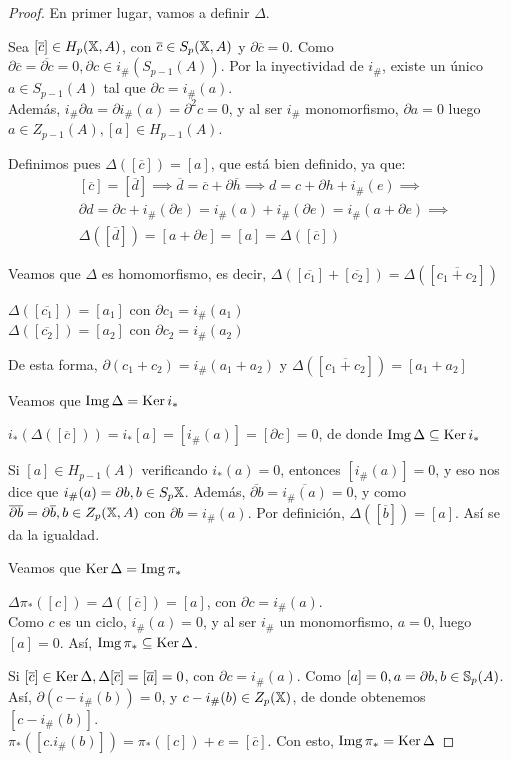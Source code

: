 \begin{proof}
  En primer lugar, vamos a definir $\Delta$.

  Sea $[\overline{c}] \in H_p(\X, A)$, con $\overline{c} \in S_p(\X, A)$ y $\partial \overline{c} = 0$. Como $\partial \overline{c} = \overline{\partial c} = 0,
  \partial c \in i_\#(S_{p-1}(A))$. Por la inyectividad de $i_\#$, existe un único $a \in S_{p-1}(A)$ tal que $\partial c = i_\#(a)$. \\
  Además, $i_\# \partial a = \partial i_\#(a) = \partial^2 c = 0$, y al ser $i_\#$ monomorfismo, $\partial a = 0$ luego $a \in Z_{p-1}(A), [a] \in H_{p-1}(A)$.

  Definimos pues $\Delta([\overline{c}]) = [a]$, que está bien definido, ya que:
  \begin{align*}
    &[\overline{c}] = [\overline{d}] \implies \overline{d} = \overline{c} + \partial \overline{h} \implies d = c + \partial h + i_\#(e) \implies \\
    &\partial d = \partial c + i_\#(\partial e) = i_\#(a) + i_\#(\partial e) = i_\#(a + \partial e) \implies \\
    &\Delta([\overline{d}]) = [a + \partial e] = [a] = \Delta([\overline{c}])
  \end{align*}

  Veamos que $\Delta$ es homomorfismo, es decir, $\Delta([\overline{c_1}] + [\overline{c_2}]) = \Delta([\overline{c_1 + c_2}])$

  $\Delta([\overline{c_1}]) = [a_1]$ con $\partial c_1 = i_\#(a_1)$ \\
  $\Delta([\overline{c_2}]) = [a_2]$ con $\partial c_2 = i_\#(a_2)$

  De esta forma, $\partial(c_1 + c_2) = i_\#(a_1 + a_2)$ y $\Delta([\overline{c_1 + c_2}]) = [a_1 + a_2]$

  Veamos que $\Img \Delta = \Ker i_*$

  $i_*(\Delta([\overline{c}])) = i_*[a] = [i_\#(a)] = [\partial c] = 0$, de donde $\Img \Delta \subseteq \Ker i_*$

  Si $[a] \in H_{p-1}(A)$ verificando $i_*(a) = 0$, entonces $[i_\#(a)] = 0$, y eso nos dice que $i_\#(a) = \partial b, b \in S_p{\X}$.
  Además, $\overline{\partial b} = \overline{i_\#(a)} = 0$, y como $\overline{\partial b} = \partial \overline{b}, b \in Z_p(\X, A)$ con
  $\partial b = i_\#(a)$. Por definición, $\Delta([\overline{b}]) = [a]$. Así se da la igualdad.

  Veamos que $\Ker \Delta = \Img \pi_*$

  $\Delta\pi_*([c]) = \Delta([\overline{c}]) = [a]$, con $\partial c = i_\#(a)$. \\
  Como $c$ es un ciclo, $i_\#(a) = 0$, y al ser $i_\#$ un monomorfismo, $a = 0$, luego $[a] = 0$. Así, $\Img \pi_* \subseteq \Ker \Delta$.

  Si $[\overline{c}] \in \Ker \Delta, \Delta[\overline{c}] = [\overline{a}] = 0$, con $\partial c = i_\#(a)$. Como $[a] = 0, a = \partial b, b \in \S_p(A)$.
  Así, $\partial(c - i_\#(b)) = 0$, y $c - i_\#(b) \in Z_p(\X)$, de donde obtenemos $[c - i_\#(b)]$. \\
  $\pi_*([c . i_\#(b)]) = \pi_*([c]) + e = [\overline{c}]$. Con esto, $\Img \pi_* = \Ker \Delta$
\end{proof}

